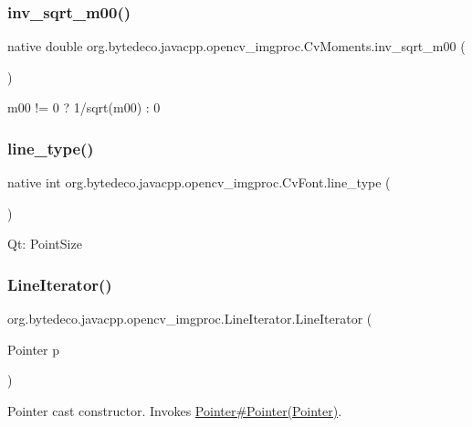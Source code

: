 \subsubsection{\texorpdfstring{inv\+\_\+sqrt\+\_\+m00()}{inv\_sqrt\_m00()}}
{\footnotesize\ttfamily native double org.\+bytedeco.\+javacpp.\+opencv\+\_\+imgproc.\+Cv\+Moments.\+inv\+\_\+sqrt\+\_\+m00 (\begin{DoxyParamCaption}{ }\end{DoxyParamCaption})}

m00 != 0 ? 1/sqrt(m00) \+: 0 \mbox{\label{group__imgproc_gaa10a37186c21769dac36657ca65b282c}} 
\subsubsection{\texorpdfstring{line\+\_\+type()}{line\_type()}}
{\footnotesize\ttfamily native int org.\+bytedeco.\+javacpp.\+opencv\+\_\+imgproc.\+Cv\+Font.\+line\+\_\+type (\begin{DoxyParamCaption}{ }\end{DoxyParamCaption})}

Qt\+: Point\+Size \mbox{\label{group__imgproc_gab596cb042f00fd0833e914b7ea024342}} 
\subsubsection{\texorpdfstring{Line\+Iterator()}{LineIterator()}\hspace{0.1cm}{\footnotesize\ttfamily [1/2]}}
{\footnotesize\ttfamily org.\+bytedeco.\+javacpp.\+opencv\+\_\+imgproc.\+Line\+Iterator.\+Line\+Iterator (\begin{DoxyParamCaption}\item[{Pointer}]{p }\end{DoxyParamCaption})\hspace{0.3cm}{\ttfamily [inline]}}

Pointer cast constructor. Invokes \hyperlink{}{Pointer\#\+Pointer(\+Pointer)}. \mbox{\label{group__imgproc_ga56929bab5a89ba1c9bc2e00073eaedb4}} 
